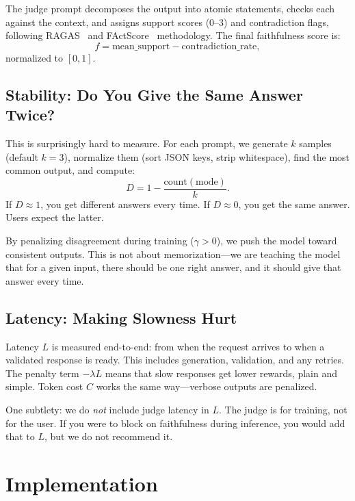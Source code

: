 \documentclass[11pt]{article}
\begin{document}
The judge prompt decomposes the output into atomic statements, checks each against the context, and assigns support scores (0--3) and contradiction flags, following RAGAS~\citep{es2023ragas} and FActScore~\citep{min2023factscore} methodology.
The final faithfulness score is:
\begin{equation}
f = \text{mean\_support} - \text{contradiction\_rate},
\end{equation}
normalized to $[0,1]$.

\subsection{Stability: Do You Give the Same Answer Twice?}

This is surprisingly hard to measure.
For each prompt, we generate $k$ samples (default $k=3$), normalize them (sort JSON keys, strip whitespace), find the most common output, and compute:
\begin{equation}
D = 1 - \frac{\text{count}(\text{mode})}{k}.
\end{equation}
If $D \approx 1$, you get different answers every time.
If $D \approx 0$, you get the same answer.
Users expect the latter.

By penalizing disagreement during training ($\gamma > 0$), we push the model toward consistent outputs.
This is not about memorization---we are teaching the model that for a given input, there should be one right answer, and it should give that answer every time.

\subsection{Latency: Making Slowness Hurt}

Latency $L$ is measured end-to-end: from when the request arrives to when a validated response is ready.
This includes generation, validation, and any retries.
The penalty term $-\lambda L$ means that slow responses get lower rewards, plain and simple.
Token cost $C$ works the same way---verbose outputs are penalized.

One subtlety: we do \emph{not} include judge latency in $L$.
The judge is for training, not for the user.
If you were to block on faithfulness during inference, you would add that to $L$, but we do not recommend it.

\section{Implementation}
\label{sec:implementation}
\end{document}
